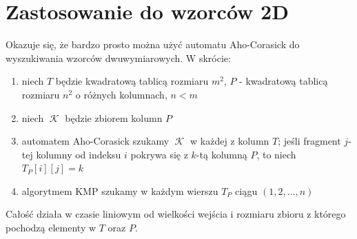 \documentclass{article}
\DeclareMathOperator{\K}{\mathcal{K}}
\begin{document}
\section{Zastosowanie do wzorców 2D}
Okazuje się, że bardzo prosto można użyć automatu Aho-Corasick do wyszukiwania wzorców dwuwymiarowych. W skrócie:
\begin{enumerate}
    \item niech $T$ będzie kwadratową tablicą rozmiaru $m^2$, $P$ - kwadratową tablicą rozmiaru $n^2$ o różnych kolumnach, $n < m$
    \item niech $\K$ będzie zbiorem kolumn $P$
    \item automatem Aho-Corasick szukamy $\K$ w każdej z kolumn $T$; jeśli fragment $j$-tej kolumny od indeksu $i$ pokrywa się z $k$-tą kolumną $P$, to niech $T_P[i][j]=k$
    \item algorytmem KMP szukamy w każdym wierszu $T_P$ ciągu $(1,2,...,n)$
\end{enumerate}
Całość działa w czasie liniowym od wielkości wejścia i rozmiaru zbioru z którego pochodzą elementy w $T$ oraz $P$.
\end{document}

